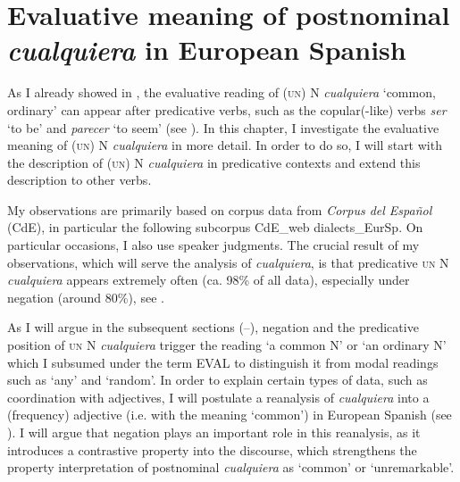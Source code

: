 \chapter{{Evaluative} {meaning} {of} {postnominal} {\textit{cualquiera} }{in} {European} {Spanish}}\label{sec:3}

As I already showed in , the evaluative reading of (\textsc{un)} N \textit{cualquiera} ‘common, ordinary’ can appear after predicative verbs, such as the copular(-like) verbs \textit{ser} ‘to be’ and \textit{parecer} ‘to seem’ (see ). In this chapter, I investigate the evaluative meaning of (\textsc{un)} N \textit{cualquiera} in more detail. In order to do so, I will start with the description of (\textsc{un)} N \textit{cualquiera} in predicative contexts and extend this description to other verbs.

{My observations are primarily based on corpus data from \textit{Corpus del Español} (CdE), in particular the following subcorpus CdE\_web dialects\_EurSp. On particular occasions, I also use speaker judgments.} The crucial result of my observations, which will serve the analysis of \textit{cualquiera}, is that predicative \textsc{un} N \textit{cualquiera} appears extremely often (ca. 98\% of all data), especially under negation (around 80\%), see .

As I will argue in the subsequent sections (–), negation and the predicative position of \textsc{un} N \textit{cualquiera} trigger the reading ‘a common N’ or ‘an ordinary N’ which I subsumed under the term EVAL to distinguish it from modal readings such as ‘any’ and ‘random’. In order to explain certain types of data, such as coordination with adjectives, I will postulate a reanalysis of \textit{cualquiera} into a (frequency) adjective (i.e. with the meaning ‘common’) in European Spanish (see ). I will argue that negation plays an important role in this reanalysis, as it introduces a contrastive property into the discourse, which strengthens the property interpretation of postnominal \textit{cualquiera} as ‘common’ or ‘unremarkable’.

